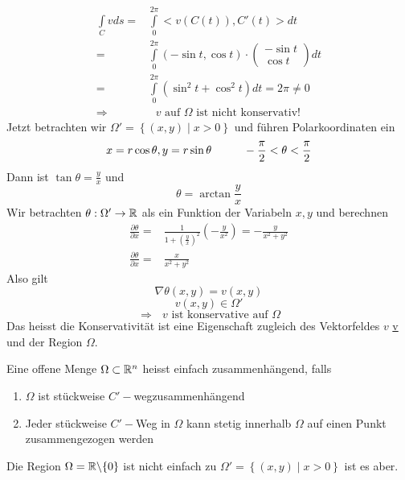 \begin{enumerate}
\begin{align*}
\int\limits_C vds  = & \int\limits_0^{2\pi } { < v\left( {C\left( t \right)} \right),C'\left( t \right) > dt} \\
= & \int\limits_0^{2\pi } \left( -\sin t,\cos t\right)\cdot  \left( {\begin{array}{*{20}{c}}
{ - \sin t}\\
{\cos t}
\end{array}} \right) dt\\
= & \int\limits_0^{2\pi } \left( \sin^2 t+\cos^2 t\right) dt=2\pi\not= 0\\
\Rightarrow &\text{ $v$ auf $\Omega$ ist nicht konservativ!}
\end{align*}
Jetzt betrachten wir $\Omega'=\left\{ \left( x,y\right) \mid x>0 \right\}$  und führen Polarkoordinaten ein \[x=r\cos\theta, y=r\sin\theta\hspace{10mm} -\frac{\pi}{2}<\theta <\frac{\pi}{2}\]
Dann ist $\tan\theta = \frac{y}{x}$ und \[\theta=\arctan\frac{y}{x}\]
Wir betrachten $\theta:\Omega'\to\mathbb{R}$ als ein Funktion der Variabeln $x,y$ und berechnen
\begin{align*}
\frac{{\partial \theta }}{{\partial x}} = & \frac{1}{{1 + {{\left( {\frac{y}{x}} \right)}^2}}}\left( { - \frac{y}{{{x^2}}}} \right) =  - \frac{y}{{{x^2} + {y^2}}}\\
\frac{{\partial \theta }}{{\partial x}} = & \frac{x}{{{x^2} + {y^2}}}
\end{align*}
Also gilt
\[\nabla \theta\left( x,y\right) = v\left( x,y\right)\]
\[v\left( x,y\right) \in\Omega'\]
$$\Rightarrow\text{ $v$ ist konservative auf $\Omega$}$$
Das heisst die Konservativität ist eine Eigenschaft zugleich des Vektorfeldes $v$ \underline{v} und der Region $\Omega$.
\end{enumerate}

\begin{definition}{8.49}
Eine offene Menge $\Omega\subset\mathbb{R}^n$ heisst einfach zusammenhängend, falls
\begin{enumerate}
\item $\Omega$ ist stückweise $C'-$wegzusammenhängend
\item Jeder stückweise $C'-$Weg in $\Omega$ kann stetig innerhalb $\Omega$ auf einen Punkt zusammengezogen werden
\end{enumerate}
Die Region $\Omega=\mathbb{R}\backslash\{ 0\}$ ist nicht einfach zu $\Omega' = \left\{ \left( x,y\right) \mid x>0\right\}$ ist es aber.%
\end{definition}

